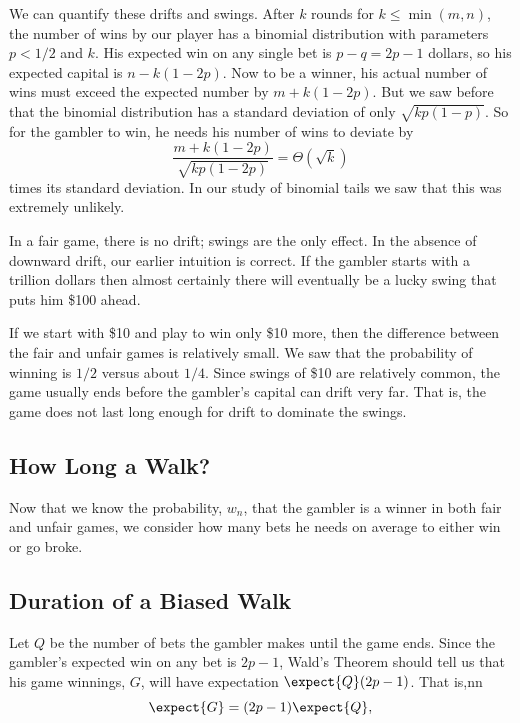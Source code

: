 \begin{staffnotes}

We can quantify these drifts and swings.  After $k$ rounds for $k \le
\min(m,n)$, the number of wins by our player has a binomial distribution
with parameters $p < 1/2$ and $k$.  His expected win on any single bet is
$p-q = 2p-1$ dollars, so his expected capital is $n-k(1-2p)$.  Now to be a
winner, his actual number of wins must exceed the expected number by
$m+k(1-2p)$.  But we saw before that the binomial distribution has a
standard deviation of only $\sqrt{kp(1-p)}$.  So for the gambler to win,
he needs his number of wins to deviate by
\[
\frac{m+k(1-2p)}{\sqrt{kp(1-2p)}}=\Theta(\sqrt{k})
\]
times its standard deviation.  In our study of binomial tails we saw that
this was extremely unlikely.

In a fair game, there is no drift; swings are the only effect.  In the
absence of downward drift, our earlier intuition is correct.  If the
gambler starts with a trillion dollars then almost certainly there
will eventually be a lucky swing that puts him \$100 ahead.

If we start with \$10 and play to win only \$10 more, then the difference
between the fair and unfair games is relatively small. We saw that the
probability of winning is $1/2$ versus about $1/4$.  Since swings of \$10
are relatively common, the game usually ends before the gambler's capital
can drift very far.  That is, the game does not last long enough for drift
to dominate the swings.

\subsection{How Long a Walk?}

Now that we know the probability, $w_n$, that the gambler is a winner in
both fair and unfair games, we consider how many bets he needs on average
to either win or go broke.

\subsection{Duration of a Biased Walk}

Let $Q$ be the number of bets the gambler makes until the game ends.  Since
the gambler's expected win on any bet is $2p-1$, Wald's Theorem should tell
us that his game winnings, $G$, will have expectation $\expect{Q}(2p-1)$.
That is,nn
\begin{equation}\label{LN12:gw}
\expect{G} = (2p-1)\expect{Q},
\end{equation}


\end{staffnotes}
